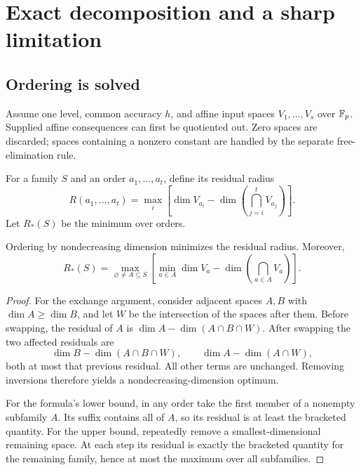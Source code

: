 \chapter{Exact decomposition and a sharp limitation}\label{ch:decomposition}

\section{Ordering is solved}
Assume one level, common accuracy $h$, and affine input spaces $V_1,\ldots,V_s$ over $\mathbb F_p$. Supplied affine consequences can first be quotiented out. Zero spaces are discarded; spaces containing a nonzero constant are handled by the separate free-elimination rule.

For a family $S$ and an order $a_1,\ldots,a_t$, define its residual radius
\[
 R(a_1,\ldots,a_t)=\max_i\left[
 \dim V_{a_i}-\dim\left(\bigcap_{j=i}^tV_{a_j}\right)\right].
\]
Let $R_*(S)$ be the minimum over orders.

\begin{lemma}\label{lem:ordering}
Ordering by nondecreasing dimension minimizes the residual radius. Moreover,
\[
 \boxed{R_*(S)=\max_{\varnothing\ne A\subseteq S}
 \left[\min_{a\in A}\dim V_a-\dim\left(\bigcap_{a\in A}V_a\right)\right].}
\]
\end{lemma}
\begin{proof}
For the exchange argument, consider adjacent spaces $A,B$ with $\dim A\ge\dim B$, and let $W$ be the intersection of the spaces after them. Before swapping, the residual of $A$ is $\dim A-\dim(A\cap B\cap W)$. After swapping the two affected residuals are
\[
 \dim B-\dim(A\cap B\cap W),\qquad
 \dim A-\dim(A\cap W),
\]
both at most that previous residual. All other terms are unchanged. Removing inversions therefore yields a nondecreasing-dimension optimum.

For the formula's lower bound, in any order take the first member of a nonempty subfamily $A$. Its suffix contains all of $A$, so its residual is at least the bracketed quantity. For the upper bound, repeatedly remove a smallest-dimensional remaining space. At each step its residual is exactly the bracketed quantity for the remaining family, hence at most the maximum over all subfamilies.
\end{proof}

